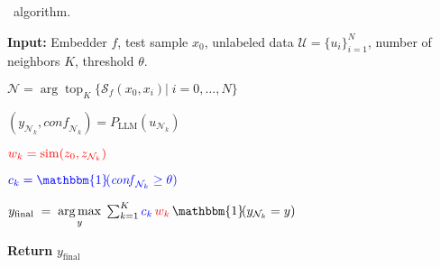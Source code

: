 \begin{algorithm}[!t]
\caption{\model~algorithm.}
\label{alg:algorithm}
\begin{algorithmic}[1]

\STATE \textbf{Input:} Embedder $f$, test sample $x_0$, unlabeled data $\mathcal{U}=\{u_i\}_{i=1}^{N}$, number of neighbors $K$, threshold $\theta$.


\STATE $\mathcal{N} = \arg\!\operatorname{top}_K \{\mathcal{S}_f(x_0, x_i)|\; i=0,\dots,N\}$
\\{\color{gray} }

    \STATE $(y_{\mathcal{N}_k}, \mathit{conf}_{\mathcal{N}_k}) = P_{\mathrm{LLM}}(u_{\mathcal{N}_k})$
    \\{\color{gray} }
    
    \STATE $\color{red}w_k = \operatorname{sim}(z_0, z_{\mathcal{N}_k})$
    \\{\color{gray} }
    
    \STATE $\color{blue}c_k = \mathbbm{1}\!(\mathit{conf}_{\mathcal{N}_k} \ge \theta)$ 
    \\{\color{gray} }
\ENDFOR

\STATE $y_{\mathrm{final}} \;=\; \underset{y}{\arg\max} \;\sum_{k=1}^{K} {\color{blue}c_k} \, {\color{red}w_k} \,\mathbbm{1}\!(y_{\mathcal{N}_k} = y)$
\\{\color{gray} }

\STATE \textbf{Return} $y_{\mathrm{final}}$

\end{algorithmic}
\end{algorithm}


